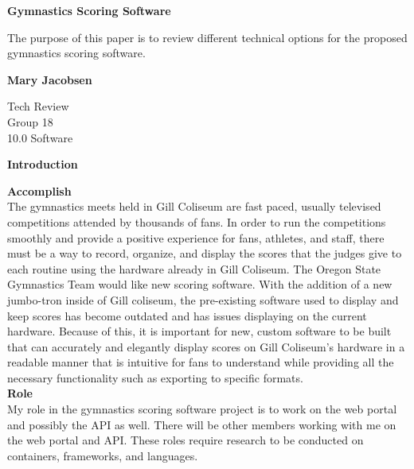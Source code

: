 \documentclass[letterpaper,10pt,draftclsnofoot,onecolumn,]{IEEEtran}
\begin{document}
\begin{titlepage}
    \begin{center}
        \vspace*{1cm}
        
        \textbf{Gymnastics Scoring Software}
        
        \vspace{0.5cm}
        The purpose of this paper is to review different technical options for the proposed gymnastics scoring software.
        
        \vspace{1.5cm}
        
        \textbf{Mary Jacobsen}
        
        Tech Review\\
        Group 18\\
        10.0 Software\\
        
    \end{center}
\end{titlepage}

\begin{center}
\textbf{Introduction}\\
\end{center}

\textbf{Accomplish}\\
The gymnastics meets held in Gill Coliseum are fast paced, usually televised competitions attended by thousands of fans. In order to run the competitions smoothly and provide a positive experience for fans, athletes, and staff, there must be a way to record, organize, and display the scores that the judges give to each routine using the hardware already in Gill Coliseum. The Oregon State Gymnastics Team would like new scoring software. With the addition of a new jumbo-tron inside of Gill coliseum, the pre-existing software used to display and keep scores has become outdated and has issues displaying on the current hardware. Because of this, it is important for new, custom software to be built that can accurately and elegantly display scores on Gill Coliseum's hardware in a readable manner that is intuitive for fans to understand while providing all the necessary functionality such as exporting to specific formats.\\

\textbf{Role}\\
My role in the gymnastics scoring software project is to work on the web portal and possibly the API as well. There will be other members working with me on the web portal and API. These roles require research to be conducted on containers, frameworks, and languages.\\
\end{document}

